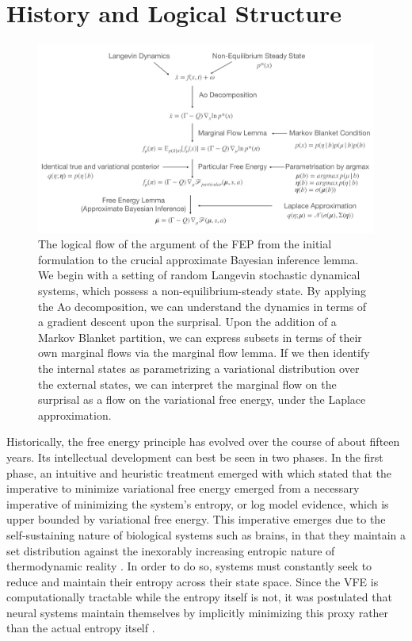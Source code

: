 \section{History and Logical Structure}
\begin{figure}
  \centering
  \includegraphics[scale=0.2]{chapter_2_figures/FEP_logic_flow.pdf}
  \caption{The logical flow of the argument of the FEP from the initial formulation to the crucial approximate Bayesian inference lemma. We begin with a setting of random Langevin stochastic dynamical systems, which possess a non-equilibrium-steady state. By applying the Ao decomposition, we can understand the dynamics in terms of a gradient descent upon the surprisal. Upon the addition of a Markov Blanket partition, we can express subsets in terms of their own marginal flows via the marginal flow lemma. If we then identify the internal states as parametrizing a variational distribution over the external states, we can interpret the marginal flow on the surprisal as a flow on the variational free energy, under the Laplace approximation.}
\end{figure}
Historically, the free energy principle has evolved over the course of about fifteen years. Its intellectual development can best be seen in two phases. In the first phase, an intuitive and heuristic treatment emerged with \citet{friston2006free} which stated that the imperative to minimize variational free energy emerged from a necessary imperative of minimizing the system's entropy, or log model evidence, which is upper bounded by variational free energy. This imperative emerges due to the self-sustaining nature of biological systems such as brains, in that they maintain a set distribution against the inexorably increasing entropic nature of thermodynamic reality \citep{friston2009free}. In order to do so, systems must constantly seek to reduce and maintain their entropy across their state space. Since the VFE is computationally tractable while the entropy itself is not, it was postulated that neural systems maintain themselves by implicitly minimizing this proxy rather than the actual entropy itself \citep{friston2010free}.

